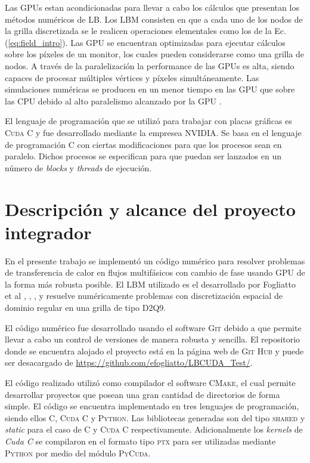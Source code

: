 Las GPUs estan acondicionadas para llevar a cabo los cálculos que presentan los métodos numéricos de LB. Los LBM consisten en que a cada uno de los nodos de la grilla discretizada se le realicen operaciones elementales como los de la Ec. (\ref{eq:field_intro}). Las GPU se encuentran optimizadas para ejecutar cálculos sobre los píxeles de un monitor, los cuales pueden considerarse como una grilla de nodos. A través de la paralelización la performance de las GPUs es alta, siendo capaces de procesar múltiples vértices y píxeles simultáneamente. Las simulaciones numéricas se producen en un menor tiempo en las GPU que sobre las CPU debido al alto paralelismo alcanzado por la GPU \cite{rinaldi2011modelos}.


El lenguaje de programación que se utilizó para trabajar con placas gráficas es \textsc{Cuda C} y fue desarrollado mediante la empresea NVIDIA. Se basa en el lenguaje de programación \textsc{C} con ciertas modificaciones para que los procesos sean en paralelo. Dichos procesos se especifican para que puedan ser lanzados en un número de \textit{blocks} y \textit{threads} de ejecución.

\newpage

\section{Descripción y alcance del proyecto integrador}

En el presente trabajo se implementó un código numérico para resolver problemas de transferencia de calor en flujos multifásicos con cambio de fase usando GPU de la forma más robusta posible. El LBM utilizado es el desarrollado por Fogliatto et al \cite{fogliatto2018modelado}, \cite{fogliatto2019simulation}, \cite{fogliatto2019transferencia}, y resuelve numéricamente problemas con discretización espacial de dominio regular en una grilla de tipo D2Q9.

El código numérico fue desarrollado usando el software \textsc{Git} debido a que permite llevar a cabo un control de versiones de manera robusta y sencilla. El repositorio donde se encuentra alojado el proyecto está en la página web de \textsc{Git Hub} y puede ser desacargado de \url{https://github.com/efogliatto/LBCUDA_Test/}. 

El código realizado utilizó como compilador el software \textsc{CMake}, el cual permite desarrollar proyectos que posean una gran cantidad de directorios de forma simple. El código se encuentra implementado en tres lenguajes de programación, siendo ellos \textsc{C}, \textsc{Cuda C} y \textsc{Python}. Las bibliotecas generadas son del tipo \textsc{shared} y \textit{static} para el caso de \textsc{C} y \textsc{Cuda C} respectivamente. Adicionalmente los \textit{kernels} de \textit{Cuda C} se compilaron en el formato tipo \textsc{ptx} para ser utilizadas mediante \textsc{Python} por medio del módulo \textsc{PyCuda}.

